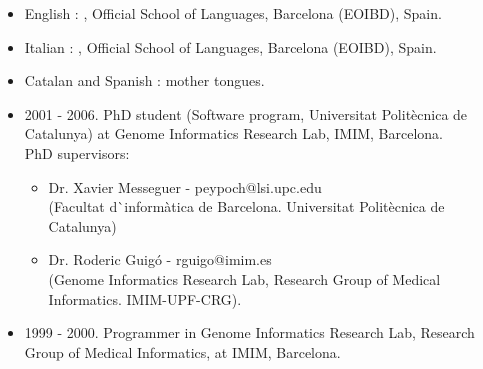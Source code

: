 \vspace{0.5cm}

\begin{itemize}
\item English : , Official School of Languages, 
Barcelona (EOIBD), Spain.
\item Italian : , Official School of Languages, 
Barcelona (EOIBD), Spain.
\item Catalan and Spanish : mother tongues.
\end{itemize}


\begin{itemize}
\item 2001 - 2006. PhD student (Software program, Universitat Polit\`ecnica de Catalunya) 
at Genome Informatics Research Lab, IMIM, Barcelona.\\ 
\noindent PhD supervisors:
\begin{itemize}
\item Dr. Xavier Messeguer - peypoch@lsi.upc.edu\\
(Facultat d\`{ }inform\`atica de Barcelona. Universitat Polit\`ecnica de Catalunya) 
\item
Dr. Roderic Guig\'{o} - rguigo@imim.es\\
(Genome Informatics Research Lab, Research Group of Medical Informatics. 
IMIM-UPF-CRG).
\end{itemize}

\item 1999 - 2000. Programmer in Genome Informatics Research Lab, Research Group 
of Medical Informatics, at IMIM, Barcelona.
\end{itemize}

